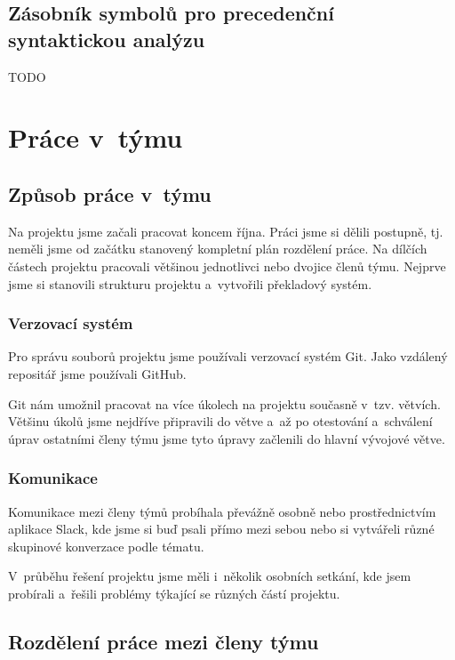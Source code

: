 \documentclass[a4paper, 11pt]{article}
\begin{document}
	\subsection{Zásobník symbolů pro precedenční syntaktickou analýzu}

	TODO


	\section{Práce v~týmu}

	\subsection{Způsob práce v~týmu}

	Na projektu jsme začali pracovat koncem října. Práci jsme si dělili postupně, tj. neměli jsme od začátku
	stanovený kompletní plán rozdělení práce. Na dílčích částech projektu pracovali většinou jednotlivci nebo
	dvojice členů týmu. Nejprve jsme si stanovili strukturu projektu a~vytvořili překladový systém.

	\subsubsection{Verzovací systém}

	Pro správu souborů projektu jsme používali verzovací systém Git. Jako vzdálený repositář jsme používali \mbox{GitHub}.

	Git nám umožnil pracovat na více úkolech na projektu současně v~tzv. větvích. Většinu úkolů jsme nejdříve připravili
	do větve a~až po otestování a~schválení úprav ostatními členy týmu jsme tyto úpravy začlenili do hlavní
	vývojové větve.

	\subsubsection{Komunikace}

	Komunikace mezi členy týmů probíhala převážně osobně nebo prostřednictvím aplikace Slack, kde jsme si buď
	psali přímo mezi sebou nebo si vytvářeli různé skupinové konverzace podle tématu.

	V~průběhu řešení projektu jsme měli i~několik osobních setkání, kde jsem probírali a~řešili problémy
	týkající se různých částí projektu.


	\subsection{Rozdělení práce mezi členy týmu}
\end{document}
